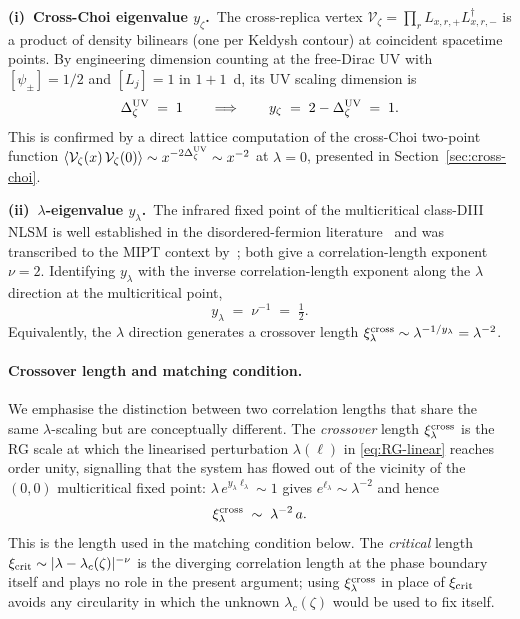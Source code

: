\textbf{(i)~Cross-Choi eigenvalue $y_\zeta$.}~The cross-replica vertex
$\mathcal V_\zeta = \prod_r L_{x,r,+}L^\dagger_{x,r,-}$ is a product of
density bilinears (one per Keldysh contour) at coincident spacetime
points.  By engineering dimension counting at the free-Dirac UV with
$[\psi_\pm]=1/2$ and $[L_j]=1$ in $1+1$~d, its UV scaling dimension is
\begin{equation}\label{eq:Delta-zeta-UV}
  \Delta_\zeta^{\rm UV} \;=\; 1
  \qquad\Longrightarrow\qquad
  y_\zeta \;=\; 2-\Delta_\zeta^{\rm UV} \;=\; 1.
\end{equation}
This is confirmed by a direct lattice computation of the cross-Choi
two-point function $\langle\mathcal V_\zeta(x)\,\mathcal V_\zeta(0)\rangle\sim
x^{-2\Delta_\zeta^{\rm UV}}\sim x^{-2}$ at $\lambda=0$, presented in
Section~\ref{sec:cross-choi}.

\textbf{(ii)~$\lambda$-eigenvalue $y_\lambda$.}~The infrared fixed
point of the multicritical class-DIII NLSM is well established in the
disordered-fermion literature~\cite{KonigBrouwer2014} and was
transcribed to the MIPT context by~\cite{LeGalSchiro2025}; both give
a correlation-length exponent $\nu=2$.  Identifying $y_\lambda$ with
the inverse correlation-length exponent along the $\lambda$ direction
at the multicritical point,
\begin{equation}\label{eq:y-lambda}
  y_\lambda\;=\;\nu^{-1}\;=\;\tfrac{1}{2}.
\end{equation}
Equivalently, the $\lambda$ direction generates a crossover length
$\xi_\lambda^{\rm cross}\sim\lambda^{-1/y_\lambda}=\lambda^{-2}$.

\paragraph{Crossover length and matching condition.}
We emphasise the distinction between two correlation lengths that
share the same $\lambda$-scaling but are conceptually different.  The
\emph{crossover} length $\xi_\lambda^{\rm cross}$ is the RG scale at
which the linearised perturbation $\lambda(\ell)$ in
\eqref{eq:RG-linear} reaches order unity, signalling that the system
has flowed out of the vicinity of the $(0,0)$ multicritical fixed
point: $\lambda\,e^{y_\lambda\ell_\lambda}\sim 1$ gives
$e^{\ell_\lambda}\sim\lambda^{-2}$ and hence
\begin{equation}\label{eq:xi-lambda-cross}
  \xi_\lambda^{\rm cross}\;\sim\;\lambda^{-2}\,a.
\end{equation}
This is the length used in the matching condition below.  The
\emph{critical} length $\xi_{\rm crit}\sim|\lambda-\lambda_c(\zeta)|^{-\nu}$
is the diverging correlation length at the phase boundary itself and
plays no role in the present argument; using
$\xi_\lambda^{\rm cross}$ in place of $\xi_{\rm crit}$ avoids any
circularity in which the unknown $\lambda_c(\zeta)$ would be used to
fix itself.

